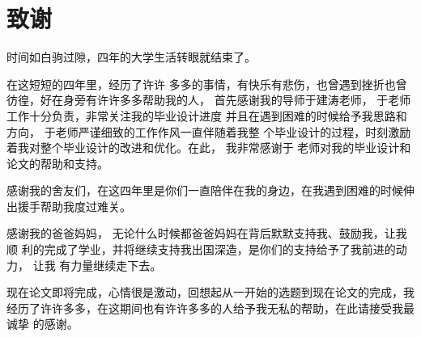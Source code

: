 \chapter*{致谢}

时间如白驹过隙，四年的大学生活转眼就结束了。

在这短短的四年里，经历了许许
多多的事情，有快乐有悲伤，也曾遇到挫折也曾彷徨，好在身旁有许许多多帮助我的人，
首先感谢我的导师于建涛老师， 于老师工作十分负责，非常关注我的毕业设计进度
并且在遇到困难的时候给予我思路和方向， 于老师严谨细致的工作作风一直伴随着我整
个毕业设计的过程，时刻激励着我对整个毕业设计的改进和优化。在此， 我非常感谢于
老师对我的毕业设计和论文的帮助和支持。

感谢我的舍友们，在这四年里是你们一直陪伴在我的身边，在我遇到困难的时候伸
出援手帮助我度过难关。

感谢我的爸爸妈妈， 无论什么时候都爸爸妈妈在背后默默支持我、鼓励我，让我顺
利的完成了学业，并将继续支持我出国深造，是你们的支持给予了我前进的动力， 让我
有力量继续走下去。

现在论文即将完成，心情很是激动，回想起从一开始的选题到现在论文的完成，我
经历了许许多多，在这期间也有许许多多的人给予我无私的帮助，在此请接受我最诚挚
的感谢。

